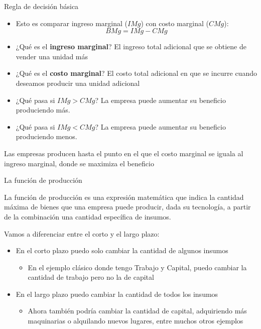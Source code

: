 \documentclass{beamer}
\begin{document}
\begin{frame}{Regla de decisión básica}
\begin{itemize}
\item Esto es comparar ingreso marginal ($IMg$) con costo marginal ($CMg$): 
        \[
        BMg = IMg - CMg
        \]
        \item ¿Qué es el \textbf{ingreso marginal}? El ingreso total adicional que se obtiene de vender una unidad más
        \item ¿Qué es el \textbf{costo marginal}? El costo total adicional en que se incurre cuando deseamos producir una unidad adicional
        \item ¿Qué pasa si $IMg > CMg$? La empresa puede aumentar su beneficio produciendo más.
        \item ¿Qué pasa si $IMg < CMg$? La empresa puede aumentar su beneficio produciendo menos.
    \end{itemize}
    \begin{boxB}
        \begin{center}
            Las empresas producen hasta el punto en el que el costo marginal se iguala al ingreso marginal, donde se maximiza el beneficio
        \end{center}
    \end{boxB}
\end{frame}

\begin{frame}{La función de producción}
    \begin{boxA}
        \begin{center}
            La función de producción es una expresión matemática que indica la cantidad máxima de bienes que una empresa puede producir, dada su tecnología, a partir de la combinación una cantidad específica de insumos.
        \end{center}
    \end{boxA}
    Vamos a diferenciar entre el corto y el largo plazo:
    \begin{itemize}
        \item En el corto plazo puedo solo cambiar la cantidad de algunos insumos
        \begin{itemize}
            \item En el ejemplo clásico donde tengo Trabajo y Capital, puedo cambiar la cantidad de trabajo pero no la de capital
        \end{itemize}
        \item En el largo plazo puedo cambiar la cantidad de todos los insumos
        \begin{itemize}
            \item Ahora también podría cambiar la cantidad de capital, adquiriendo más maquinarias o alquilando nuevos lugares, entre muchos otros ejemplos
        \end{itemize}
    \end{itemize}
\end{frame}
\end{document}
